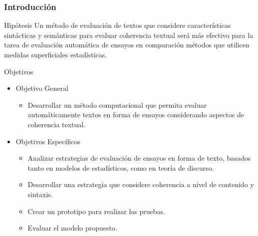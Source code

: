 \documentclass{beamer}
\begin{document}

\begin{frame}
\frametitle{Introducción}
\begin{block}{Hipótesis}
Un método de evaluación de textos que considere características sintácticas y semánticas para evaluar coherencia textual será más efectivo para la tarea de evaluación automática de ensayos en comparación métodos que utilicen medidas superficiales estadísticas.
\end{block}

\end{frame}

\begin{frame}
\begin{block}{Objetivos}
\begin{itemize}
	\item Objetivo General
	\begin{itemize}
		\item Desarrollar un método computacional que permita evaluar automáticamente textos en forma de ensayos considerando aspectos de coherencia textual.
	\end{itemize}
	\item Objetivos Específicos
	\begin{itemize}
		\item Analizar estrategias de evaluación de ensayos en forma de texto, basados tanto en modelos de estadísticos, como en teoría de discurso.
		\item Desarrollar una estrategia que considere coherencia a nivel de contenido y sintaxis.
		\item Crear un prototipo para realizar las pruebas.
		\item Evaluar el modelo propuesto.
	\end{itemize}
\end{itemize}
\end{block}
\end{frame}
\end{document}
